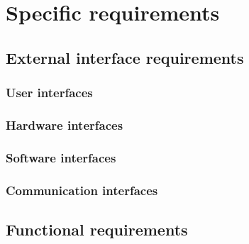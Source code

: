 \section{Specific requirements}
\label{sec:specreq}
  \subsection{External interface requirements}
    \subsubsection{User interfaces}
    \label{sec:userinterfaces}
    \subsubsection{Hardware interfaces}
    \subsubsection{Software interfaces}
    \subsubsection{Communication interfaces}

  \subsection{Functional requirements}

